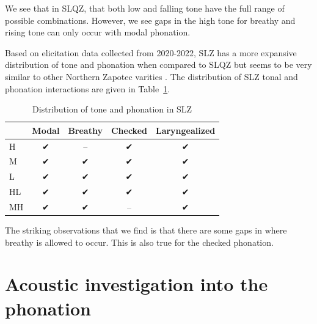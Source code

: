 \documentclass[12pt, letterpaper]{article}
\providecommand{\lsptoprule}{\midrule\toprule}
\providecommand{\lspbottomrule}{\bottomrule\midrule}
\begin{document}
We see that in SLQZ, that both low and falling tone have the full range of possible combinations. However, we see gaps in the high tone for breathy and rising tone can only occur with modal phonation. 

Based on elicitation data collected from 2020-2022, SLZ has a more expansive distribution of tone and phonation when compared to SLQZ but seems to be very similar to other Northern Zapotec varities \citep[e.g.,][]{avelinobecerraTopicsYalalagZapotec2004}. The distribution of SLZ tonal and phonation interactions are given in Table~\ref{tab:ToneVoiceQuality}. 
\begin{table}[!h]
	\caption{Distribution of tone and phonation in SLZ}
	\label{tab:ToneVoiceQuality}
	\centering

	\begin{tabular}{lcccc}
	\lsptoprule
		& \textbf{Modal} & \textbf{Breathy} & \textbf{Checked} & \textbf{Laryngealized} \\
	\hline
	H	& ✔ & -- & ✔ & ✔ \\
	M	& ✔ & ✔ & ✔ & ✔\\
	L	& ✔	& ✔ & ✔ & ✔\\
	HL	& ✔	& ✔ & ✔ & ✔\\
	MH	& ✔	& ✔ & -- & ✔ \\
	\lspbottomrule
	\end{tabular}
\end{table}

The striking observations that we find is that there are some gaps in where breathy is allowed to occur. This is also true for the checked phonation. 


\section{Acoustic investigation into the phonation} \label{sec:Acoustics}
\end{document}
